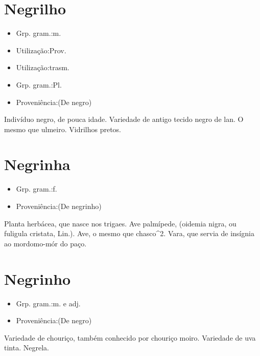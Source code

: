 \section{Negrilho}
\begin{itemize}
\item {Grp. gram.:m.}
\end{itemize}
\begin{itemize}
\item {Utilização:Prov.}
\end{itemize}
\begin{itemize}
\item {Utilização:trasm.}
\end{itemize}
\begin{itemize}
\item {Grp. gram.:Pl.}
\end{itemize}
\begin{itemize}
\item {Proveniência:(De \textunderscore negro\textunderscore )}
\end{itemize}
Indivíduo negro, de pouca idade.
Variedade de antigo tecido negro de lan.
O mesmo que \textunderscore ulmeiro\textunderscore .
Vidrilhos pretos.
\section{Negrinha}
\begin{itemize}
\item {Grp. gram.:f.}
\end{itemize}
\begin{itemize}
\item {Proveniência:(De \textunderscore negrinho\textunderscore )}
\end{itemize}
Planta herbácea, que nasce nos trigaes.
Ave palmípede, (\textunderscore oidemia nigra\textunderscore , ou \textunderscore fuligula cristata\textunderscore , Lin.).
Ave, o mesmo que \textunderscore chasco\textunderscore ^2.
Vara, que servia de insígnia ao mordomo-mór do paço.
\section{Negrinho}
\begin{itemize}
\item {Grp. gram.:m.  e  adj.}
\end{itemize}
\begin{itemize}
\item {Proveniência:(De \textunderscore negro\textunderscore )}
\end{itemize}
Variedade de chouriço, também conhecido por \textunderscore chouriço moiro\textunderscore .
Variedade de uva tinta.
Negrela.
